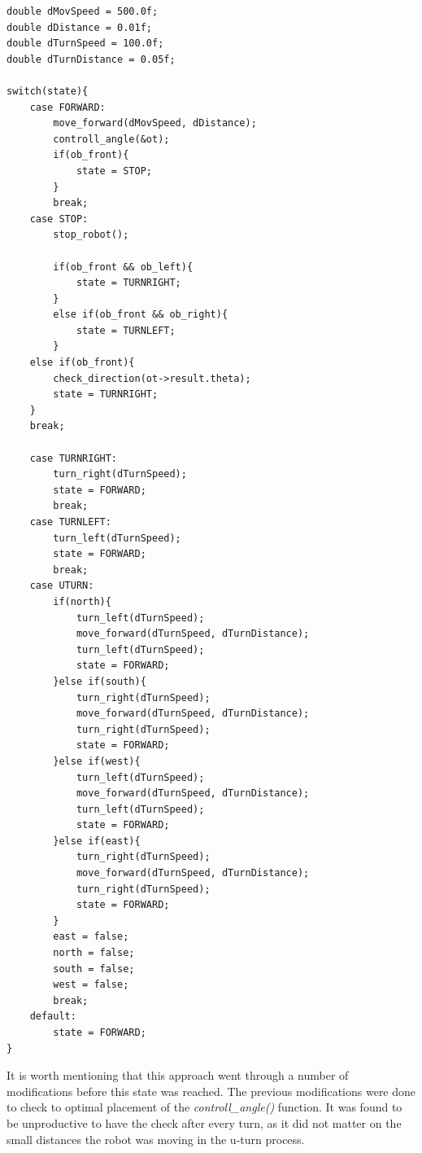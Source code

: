 \begin{lstlisting}[caption={Early Control loop snipped}]
double dMovSpeed = 500.0f;
double dDistance = 0.01f;
double dTurnSpeed = 100.0f;
double dTurnDistance = 0.05f;	

switch(state){
	case FORWARD:
		move_forward(dMovSpeed, dDistance);
		controll_angle(&ot);
		if(ob_front){
			state = STOP;
		}
		break;	
	case STOP:
		stop_robot();

		if(ob_front && ob_left){
			state = TURNRIGHT;
		}
		else if(ob_front && ob_right){
			state = TURNLEFT;
		}
	else if(ob_front){
		check_direction(ot->result.theta);
		state = TURNRIGHT;
	}
	break;	

	case TURNRIGHT:
		turn_right(dTurnSpeed);
		state = FORWARD;
		break;
	case TURNLEFT:
		turn_left(dTurnSpeed);
		state = FORWARD;
		break;
	case UTURN:
		if(north){
			turn_left(dTurnSpeed);
			move_forward(dTurnSpeed, dTurnDistance);
			turn_left(dTurnSpeed);
			state = FORWARD;
		}else if(south){
			turn_right(dTurnSpeed);
			move_forward(dTurnSpeed, dTurnDistance);
			turn_right(dTurnSpeed);
			state = FORWARD;
		}else if(west){
			turn_left(dTurnSpeed);
			move_forward(dTurnSpeed, dTurnDistance);
			turn_left(dTurnSpeed);
			state = FORWARD;
		}else if(east){
			turn_right(dTurnSpeed);
			move_forward(dTurnSpeed, dTurnDistance);
			turn_right(dTurnSpeed);
			state = FORWARD;
		}
		east = false;
		north = false;
		south = false;
		west = false;
		break;
	default:
		state = FORWARD;
}
\end{lstlisting}

It is worth mentioning that this approach went through a number of modifications before this state was reached. The previous modifications were done to check to optimal placement of the \textit{controll\_angle()} function. It was found to be unproductive to have the check after every turn, as it did not matter on the small distances the robot was moving in the u-turn process. \\

